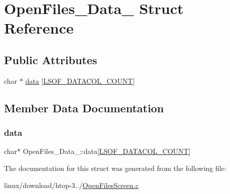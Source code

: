 \hypertarget{structOpenFiles__Data__}{}\section{Open\+Files\+\_\+\+Data\+\_\+ Struct Reference}
\label{structOpenFiles__Data__}
\subsection*{Public Attributes}
\begin{DoxyCompactItemize}
\item 
char $\ast$ \hyperlink{structOpenFiles__Data___a34b6035b095d639d79873217cd41e341}{data} \mbox{[}\hyperlink{OpenFilesScreen_8c_a76c37d4941ca3892deded6425ffb056f}{L\+S\+O\+F\+\_\+\+D\+A\+T\+A\+C\+O\+L\+\_\+\+C\+O\+U\+NT}\mbox{]}
\end{DoxyCompactItemize}


\subsection{Member Data Documentation}
\mbox{\label{structOpenFiles__Data___a34b6035b095d639d79873217cd41e341}} 
\subsubsection{\texorpdfstring{data}{data}}
{\footnotesize\ttfamily char$\ast$ Open\+Files\+\_\+\+Data\+\_\+\+::data\mbox{[}\hyperlink{OpenFilesScreen_8c_a76c37d4941ca3892deded6425ffb056f}{L\+S\+O\+F\+\_\+\+D\+A\+T\+A\+C\+O\+L\+\_\+\+C\+O\+U\+NT}\mbox{]}}



The documentation for this struct was generated from the following file\+:\begin{DoxyCompactItemize}
\item 
linux/download/htop-\/3../\hyperlink{OpenFilesScreen_8c}{Open\+Files\+Screen.\+c}\end{DoxyCompactItemize}
